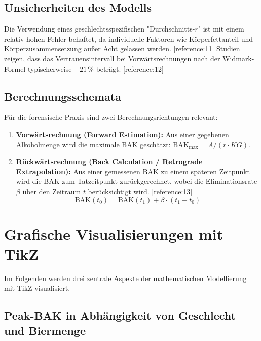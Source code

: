 \documentclass[11pt,a4paper]{article}
\begin{document}
	\subsection{Unsicherheiten des Modells}
	Die Verwendung eines geschlechtsspezifischen "Durchschnitts-$r$" ist mit einem relativ hohen Fehler behaftet, da individuelle Faktoren wie Körperfettanteil und Körperzusammensetzung außer Acht gelassen werden. [reference:11] Studien zeigen, dass das Vertrauensintervall bei Vorwärtsrechnungen nach der Widmark-Formel typischerweise $\pm 21\,\%$ beträgt. [reference:12]
	
	\subsection{Berechnungsschemata}
	Für die forensische Praxis sind zwei Berechnungsrichtungen relevant:
	\begin{enumerate}
		\item \textbf{Vorwärtsrechnung (Forward Estimation):} Aus einer gegebenen Alkoholmenge wird die maximale BAK geschätzt: $\text{BAK}_{\text{max}} = A / (r \cdot KG)$.
		\item \textbf{Rückwärtsrechnung (Back Calculation / Retrograde Extrapolation):} Aus einer gemessenen BAK zu einem späteren Zeitpunkt wird die BAK zum Tatzeitpunkt zurückgerechnet, wobei die Eliminationsrate $\beta$ über den Zeitraum $t$ berücksichtigt wird. [reference:13]
		\[
		\text{BAK}(t_0) = \text{BAK}(t_1) + \beta \cdot (t_1 - t_0)
		\]
	\end{enumerate}
	
	\section{Grafische Visualisierungen mit TikZ}
	Im Folgenden werden drei zentrale Aspekte der mathematischen Modellierung mit TikZ visualisiert.
	
	\subsection{Peak-BAK in Abhängigkeit von Geschlecht und Biermenge}
	
\end{document}
